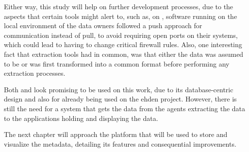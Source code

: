 Either way, this study will help on further development processes, due to the aspects that certain tools might alert to, such as, on \cite{popmednet}, software running on the local environment of the data owners followed a push approach for communication instead of pull, to avoid requiring open ports on their systems, which could lead to having to change critical firewall rules.
Also, one interesting fact that extraction tools had in common, was that either the data was assumed to be or was first transformed into a common format before performing any extraction processes.

Both \cite{montra} and \cite{achilles-github} look promising to be used on this work, due to its database-centric design and also for already being used on the \gls{ehden} project.
However, there is still the need for a system that gets the data from the agents extracting the data to the applications holding and displaying the data.

The next chapter will approach the platform that will be used to store and visualize the metadata, detailing its features and consequential improvements.
